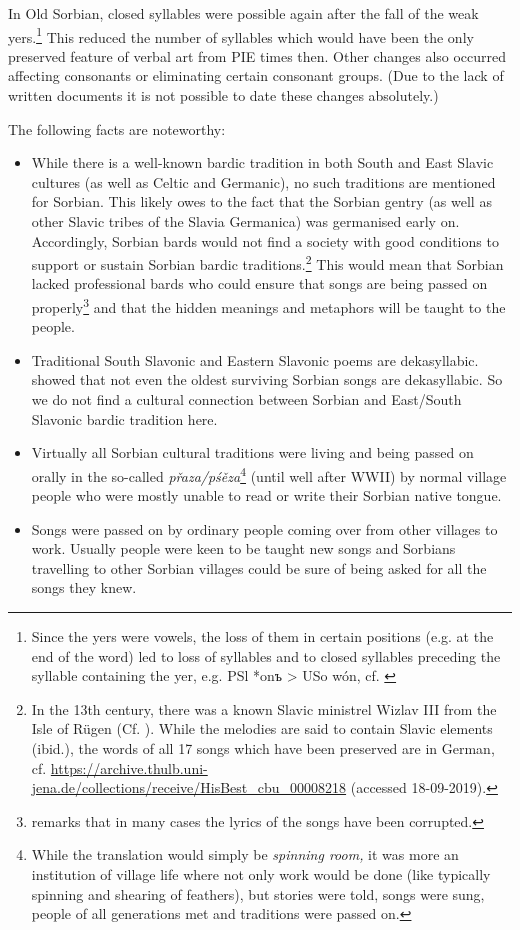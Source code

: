 \documentclass[output=paper,hidelinks]{langscibook}
\begin{document}
In Old Sorbian, closed syllables were possible again after the fall of the weak yers.\footnote{Since the yers were vowels, the loss of them in certain positions (e.g. at the end of the word) led to loss of syllables and to closed syllables preceding the syllable containing the yer, e.g. PSl *on{{ъ}} > USo wón, cf. \citet[57f]{Schaarschmidt1997}} This reduced the number of syllables which would have been the only preserved feature of verbal art from PIE times then. Other changes also occurred affecting consonants or eliminating certain consonant groups. (Due to the lack of written documents it is not possible to date these changes absolutely.)
 
 
The following facts are noteworthy:
 
\begin{itemize}
\item While there is a well-known bardic tradition in both South and East Slavic cultures (as well as Celtic and Germanic), no such traditions are mentioned for Sorbian. This likely owes to the fact that the Sorbian gentry (as well as other Slavic tribes of the Slavia Germanica) was germanised early on. Accordingly, Sorbian bards would not find a society with good conditions to support or sustain Sorbian bardic traditions.\footnote{In the 13th century, there was a known Slavic ministrel Wizlav III from the Isle of Rügen (Cf. \citealt[12f]{Rawp1978}). While the melodies are said to contain Slavic elements (ibid.), the words of all 17 songs which have been preserved are in German, cf. \url{https://archive.thulb.uni-jena.de/collections/receive/HisBest_cbu_00008218} (accessed 18-09-2019).} This would mean that Sorbian lacked professional bards who could ensure that songs are being passed on properly\footnote{\citet[197]{Nedo1966} remarks that in many cases the lyrics of the songs have been corrupted.} and that the hidden meanings and metaphors will be taught to the people.
\item Traditional South Slavonic and Eastern Slavonic poems are dekasyllabic. \citet{Rawp1957} showed that not even the oldest surviving Sorbian songs are dekasyllabic. So we do not find a cultural connection between Sorbian and East/South Slavonic bardic tradition here.
\item Virtually all Sorbian cultural traditions were living and being passed on orally in the so-called \textit{přaza/pśěza}\footnote{While the translation would simply be \textit{spinning room,} it was more an institution of village life where not only work would be done (like typically spinning and shearing of feathers), but stories were told, songs were sung, people of all generations met and traditions were passed on.} (until well after WWII) by normal village people who were mostly unable to read or write their Sorbian native tongue.
\item Songs were passed on by ordinary people coming over from other villages to work. Usually people were keen to be taught new songs and Sorbians travelling to other Sorbian villages could be sure of being asked for all the songs they knew.
\end{itemize}
 
\end{document}
